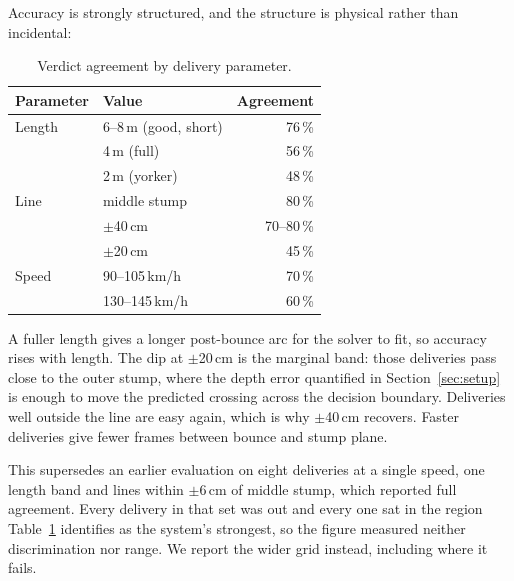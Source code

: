 Accuracy is strongly structured, and the structure is physical rather than incidental:

\begin{table}[!t]
\caption{Verdict agreement by delivery parameter.}
\label{tab:wide_break}
\centering
\begin{tabular}{@{}llr@{}}
\toprule
\textbf{Parameter} & \textbf{Value} & \textbf{Agreement}\\
\midrule
Length & 6--8\,m (good, short) & 76\,\%\\
       & 4\,m (full)           & 56\,\%\\
       & 2\,m (yorker)         & 48\,\%\\
\midrule
Line   & middle stump          & 80\,\%\\
       & $\pm$40\,cm           & 70--80\,\%\\
       & $\pm$20\,cm           & 45\,\%\\
\midrule
Speed  & 90--105\,km/h         & 70\,\%\\
       & 130--145\,km/h        & 60\,\%\\
\bottomrule
\end{tabular}
\end{table}

A fuller length gives a longer post-bounce arc for the solver to fit, so accuracy rises with
length. The dip at $\pm$20\,cm is the marginal band: those deliveries pass close to the outer
stump, where the depth error quantified in Section~\ref{sec:setup} is enough to move the predicted
crossing across the decision boundary. Deliveries well outside the line are easy again, which is
why $\pm$40\,cm recovers. Faster deliveries give fewer frames between bounce and stump plane.

This supersedes an earlier evaluation on eight deliveries at a single speed, one length band and
lines within $\pm$6\,cm of middle stump, which reported full agreement. Every delivery in that set
was out and every one sat in the region Table~\ref{tab:wide_break} identifies as the system's
strongest, so the figure measured neither discrimination nor range. We report the wider grid
instead, including where it fails.
